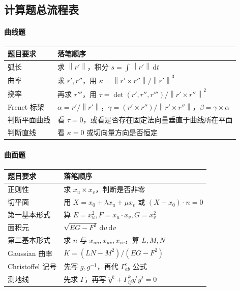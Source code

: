 \documentclass[UTF8,12pt,a4paper]{ctexart}
\newcommand{\dd}{\,\mathrm d}
\newcommand{\norm}[1]{\left\lVert #1\right\rVert}
\begin{document}
\subsection{计算题总流程表}

\paragraph{曲线题}
\begin{longtable}{>{\raggedright\arraybackslash}p{}>{\raggedright\arraybackslash}p{}}
\toprule
题目要求 & 落笔顺序\\
\midrule
弧长 & 求 $\norm{r'}$，积分 $s=\int\norm{r'}\dd t$\\
曲率 & 求 $r',r''$，用 $\kappa=\norm{r'\times r''}/\norm{r'}^3$\\
挠率 & 再求 $r'''$，用 $\tau=\det(r',r'',r''')/\norm{r'\times r''}^2$\\
Frenet 标架 & $\alpha=r'/\norm{r'}$，$\gamma=(r'\times r'')/\norm{r'\times r''}$，$\beta=\gamma\times\alpha$\\
判断平面曲线 & 看 $\tau=0$，或看是否存在固定法向量垂直于曲线所在平面\\
判断直线 & 看 $\kappa=0$ 或切向量方向是否恒定\\
\bottomrule
\end{longtable}

\paragraph{曲面题}
\begin{longtable}{>{\raggedright\arraybackslash}p{}>{\raggedright\arraybackslash}p{}}
\toprule
题目要求 & 落笔顺序\\
\midrule
正则性 & 求 $x_u\times x_v$，判断是否非零\\
切平面 & 用 $X=x_0+\lambda x_u+\mu x_v$ 或 $(X-x_0)\cdot n=0$\\
第一基本形式 & 算 $E=x_u^2,F=x_u\cdot x_v,G=x_v^2$\\
面积元 & $\sqrt{EG-F^2}\dd u\dd v$\\
第二基本形式 & 求 $n$ 与 $x_{uu},x_{uv},x_{vv}$，算 $L,M,N$\\
Gaussian 曲率 & $K=(LN-M^2)/(EG-F^2)$\\
Christoffel 记号 & 先写 $g,g^{-1}$，再代 $\Gamma^c_{ab}$ 公式\\
测地线 & 先求 $\Gamma$，再写 $\ddot y^k+\Gamma^k_{ij}\dot y^i\dot y^j=0$\\
\bottomrule
\end{longtable}
\end{document}
